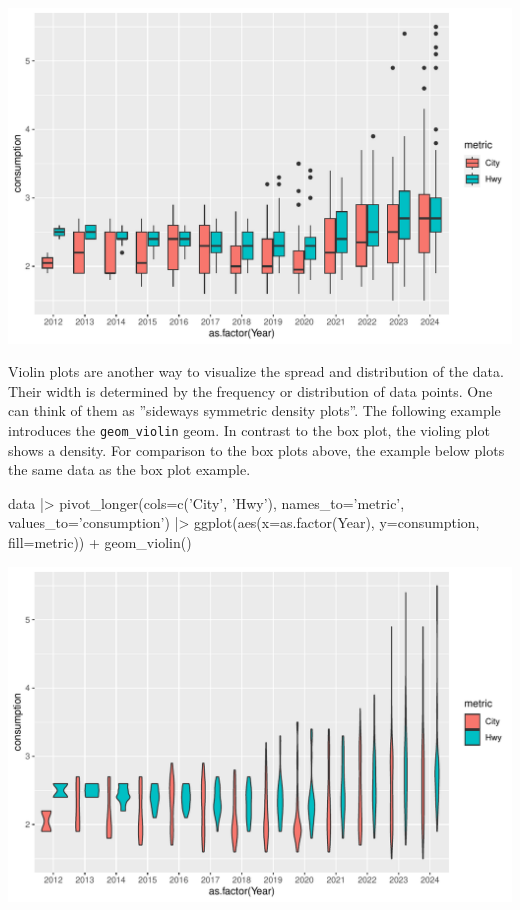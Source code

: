 \begin{center}
  \includegraphics[width=.8\textwidth]{fuel.box.pdf}
\end{center}

Violin plots are another way to visualize the spread and distribution of the data. Their width is determined by the frequency or distribution of data points. One can think of them as ''sideways symmetric density plots''. The following example introduces the \texttt{geom\_violin} geom. In contrast to the box plot, the violing plot shows a density. For comparison to the box plots above, the example below plots the same data as the box plot example.

\begin{Rcode}
data |>
  pivot_longer(cols=c('City', 'Hwy'), 
               names_to='metric', 
               values_to='consumption') |>
  ggplot(aes(x=as.factor(Year), y=consumption, fill=metric)) +
    geom_violin()
\end{Rcode}

\begin{center}
  \includegraphics[width=.8\textwidth]{fuel.violin.pdf}
\end{center}

